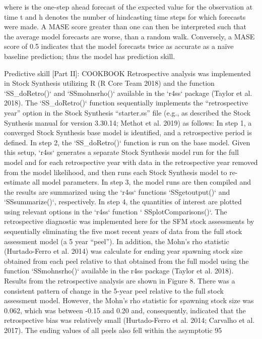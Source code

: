 where  is the one-step ahead forecast of the expected value for the observation at time t and h denotes the number of hindcasting time steps for which forecasts   were made. A MASE score greater than one can then be interpreted such that the average model forecasts are worse, than a random walk. Conversely, a MASE score of 0.5 indicates that the model forecasts twice as accurate as a naïve baseline prediction; thus the model has prediction skill.  

Predictive skill [Part II]: COOKBOOK 
Retrospective analysis was implemented in Stock Synthesis utilizing R (R Core Team 2018) and the function `SS_doRetro()` and `SSmohnsrho()` available in the `r4ss` package (Taylor et al. 2018). The `SS_doRetro()` function sequentially implements the “retrospective year” option in the Stock Synthesis “starter.ss” file (e.g., as described the Stock Synthesis manual for version 3.30.14; Methot et al. 2019) as follows: In step 1, a converged Stock Synthesis base model is identified, and a retrospective period is defined. In step 2, the `SS_doRetro()` function is run on the base model. Given this setup, `r4ss` generates a separate Stock Synthesis model run for the full model and for each retrospective year with data in the retrospective year removed from the model likelihood, and then runs each Stock Synthesis model to re-estimate all model parameters. In step 3, the model runs are then compiled and the results are summarized using the `r4ss` functions `SSgetoutput()` and `SSsummarize()`, respectively.  In step 4, the quantities of interest are plotted using relevant options in the `r4ss` function ` SSplotComparisons()`. The retrospective diagnostic was implemented here for the SFM stock assessments by sequentially eliminating the five most recent years of data from the full stock assessment model (a 5 year “peel”). In addition, the Mohn’s rho statistic (Hurtado-Ferro et al. 2014) was calculate  for ending year spawning stock size obtained from each peel relative to that obtained from the full model using the function `SSmohnsrho()` available in the r4ss package (Taylor et al. 2018). 
Results from the retrospective analysis are shown in Figure 8. There was a consistent pattern of change in the 5-year peel relative to the full stock assessment model. However, the Mohn’s rho statistic for spawning stock size was 0.062, which was between -0.15 and 0.20 and, consequently, indicated that the retrospective bias was relatively small (Hurtado-Ferro et al. 2014; Carvalho et al. 2017). The ending values of all peels also fell within the asymptotic 95%
